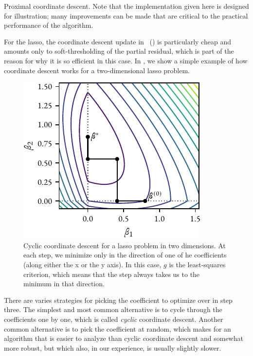\begin{algorithm}[hbtp]
  \caption{Proximal coordinate descent. Note that the implementation given here is designed for illustration; many improvements can be made that are critical to the practical performance of the algorithm.}
  \label{alg:pcd}
\end{algorithm}

For the lasso, the coordinate descent update in ~() is particularly cheap and amounts only to soft-thresholding of the partial residual, which is part of the reason for why it is so efficient in this case. In , we show a simple example of how coordinate descent works for a two-dimensional lasso problem.

\begin{figure}[htpb]
  \centering
  \includegraphics[]{figures/cd.pdf}
  \caption{%
    Cyclic coordinate descent for a lasso problem in two dimensions. At each step, we minimize only in the direction of one of he coefficients (along either the x or the y axis). In this case, \(g\) is the least-squares criterion, which means that the step always takes us to the minimum in that direction.
  }
  \label{fig:pcd-lasso}
\end{figure}

There are varies strategies for picking the coefficient to optimize over in step three. The simplest and most common alternative is to cycle through the coefficients one by one, which is called \emph{cyclic} coordinate descent. Another common alternative is to pick the coefficient at random, which makes for an algorithm that is easier to analyze than cyclic coordinate descent and somewhat more robust, but which also, in our experience, is usually slightly slower.

